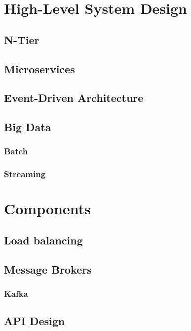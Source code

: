 \documentclass[a4paper, 11pt]{book}
\begin{document}
    \section{High-Level System Design}
    \lipsum[2]

    \subsection{N-Tier}

    \subsection{Microservices}

    \subsection{Event-Driven Architecture}

    \subsection{Big Data}

    \subsubsection{Batch}

    \subsubsection{Streaming}

    \section{Components}
    \lipsum[3]

    \subsection{Load balancing}

    \subsection{Message Brokers}

    \subsubsection{Kafka}

    \subsection{API Design}
\end{document}
